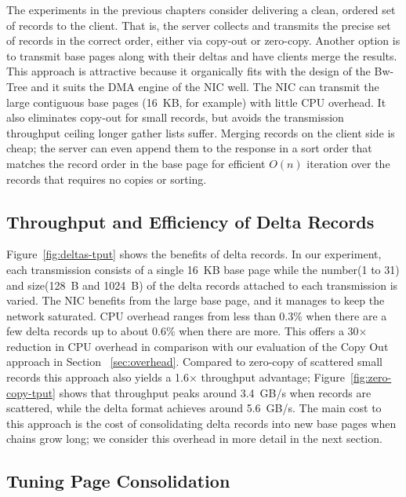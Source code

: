 The experiments in the previous chapters consider delivering a clean, ordered set of records to the
client. That is, the server collects and transmits the precise set of records
in the correct order, either via copy-out or zero-copy. Another option is to
transmit base pages along with their deltas and have clients merge the results.
This approach is attractive because it organically fits with the design of the
Bw-Tree and it suits the DMA engine of the NIC well.  The NIC can transmit the
large contiguous base pages (16~KB, for example) with little CPU overhead.
It also eliminates copy-out for small records, but avoids the transmission
throughput ceiling longer gather lists suffer. %
Merging records on the client side is cheap; the server can even append them to
the response in a sort order that matches the record order in the base page for
efficient $O(n)$ iteration over the records that requires no copies or sorting.


\subsection{Throughput and Efficiency of Delta Records}

Figure~\ref{fig:deltas-tput} shows the benefits of delta records. In our
experiment, each transmission consists of a single 16~KB base page while the
number(1 to 31) and size(128~B and 1024~B) of the delta records attached to each transmission is varied.
The NIC benefits from the large base page, and it manages to keep the network
saturated. CPU overhead ranges from less than 0.3\% when there are a few delta
records up to about 0.6\% when there are more. This offers a 30$\times$ reduction 
in CPU overhead in comparison with our evaluation of the Copy Out approach in 
Section ~\ref{sec:overhead}. Compared to zero-copy of scattered
small records this approach also yields a 1.6$\times$ throughput advantage;
Figure~\ref{fig:zero-copy-tput} shows that throughput peaks around 3.4~GB/s when
records are scattered, while the delta format achieves around  5.6~GB/s. The main cost 
to this approach is the cost of consolidating delta records into new base pages 
when chains grow long; we consider this overhead in more detail in the next section.


\subsection{Tuning Page Consolidation}
\label{sec:consolidation}


